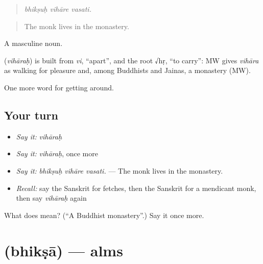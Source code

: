 \begin{quote}
  
\end{quote}

\begin{quote}
\emph{bhikṣuḥ vihāre vasati.}
\end{quote}

\begin{quote}
The monk lives in the monastery.
\end{quote}

A masculine noun.

\begin{cousinweb}
\textbf{} (\emph{vihāraḥ}) is built from \emph{vi}, \textquotedblleft{}apart\textquotedblright{}, and the root √hṛ, \textquotedblleft{}to carry\textquotedblright{}: MW gives \emph{vihāra} as walking for pleasure and, among Buddhists and Jainas, a monastery (MW).
\end{cousinweb}

\begin{grammarlens}[title={What you've built}]
One more word for getting around.
\end{grammarlens}

\subsection*{Your turn}
\begin{itemize}
\raggedright
  \item \emph{Say it:} \emph{vihāraḥ}
  \item \emph{Say it:} \emph{vihāraḥ}, once more
  \item \emph{Say it:} \emph{bhikṣuḥ vihāre vasati.} — The monk lives in the monastery.
  \item \emph{Recall:} say the Sanskrit for fetches, then the Sanskrit for a mendicant monk, then say \emph{vihāraḥ} again
\end{itemize}

\begin{tcolorbox}[breakable,colback=teal!4,colframe=teal!35!black,title={Before you move on}]
What does  mean? (\textquotedblleft{}A Buddhist monastery\textquotedblright{}.) Say it once more.
\end{tcolorbox}
\section[\texorpdfstring{\sk{भिक्षा} (bhikṣā)}{भिक्षा (bhikṣā)}]{ (bhikṣā) — alms}

